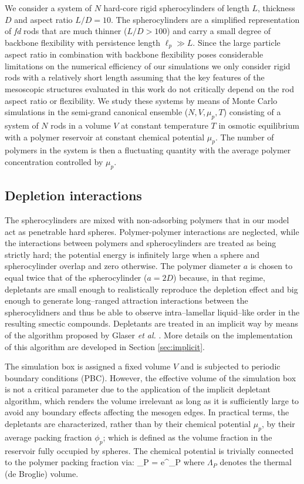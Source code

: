 We consider a system of $N$ hard-core rigid spherocylinders of length $L$, thickness $D$ and aspect ratio $L/D = 10$. The spherocylinders are a simplified representation of {\em fd} rods that are much thinner ($L/D > 100$) and carry a small degree of backbone flexibility with persistence length $\ell_{p} \gg L$. Since the large particle aspect ratio in combination with backbone flexibility poses considerable limitations on the numerical efficiency of our simulations  we  only consider rigid rods with a relatively short length assuming that the key features of the mesoscopic structures evaluated in this work do not  critically depend on the rod aspect ratio or flexibility. We study these systems by means of Monte Carlo simulations in the semi-grand canonical ensemble ($N,V,\mu_{p},T$) consisting of a system of $N$ rods in a volume $V$ at constant temperature $T$ in osmotic equilibrium with a polymer reservoir at constant chemical potential $\mu_{p}$. The number of polymers  in the system is then a fluctuating quantity with the average polymer concentration controlled by $\mu_{p}$.

\subsection{Depletion interactions}

The spherocylinders are mixed with non-adsorbing polymers that in our model act as penetrable hard spheres. Polymer-polymer interactions are neglected, while the interactions between polymers and spherocylinders are treated as being strictly hard;  the potential energy is infinitely large when a sphere and spherocylinder overlap and zero otherwise. The polymer diameter $a$ is chosen to equal twice that of the spherocylinder ($a = 2D$) because, in that regime, depletants are small enough to realistically reproduce the depletion effect and big enough to generate long--ranged attraction interactions between the spherocylidners and thus be able to observe intra--lamellar liquid--like order in the resulting smectic compounds. Depletants are treated in an implicit way by means of the algorithm proposed by Glaser {\em et al.} \cite{glaser2015parallel}. More details on the implementation of this algorithm are developed in Section \ref{sec:implicit}.

The simulation box is assigned a fixed volume $V$ and is subjected to periodic boundary conditions (PBC). However, the effective volume of the simulation box is not a critical parameter due to the application of the implicit depletant algorithm, which renders the volume irrelevant as long as it is sufficiently large to avoid any boundary effects affecting the mesogen edges. In practical terms, the depletants are characterized, rather than by their chemical potential $\mu_p$,  by their average packing fraction $\phi_p$; which is defined as the volume fraction in the reservoir fully occupied by spheres. The chemical potential is trivially connected to the polymer packing fraction via:
\beq
\phi_{P} =  e^{\beta \mu_{P}}
\eeq
where $\Lambda_{P}$ denotes the thermal (de Broglie) volume.

